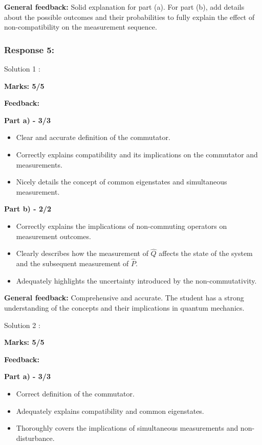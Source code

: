 \documentclass[a4paper,11pt]{article}
\begin{document}
\textbf{General feedback:}
Solid explanation for part (a). For part (b), add details about the possible outcomes and their probabilities to fully explain the effect of non-compatibility on the measurement sequence.


\subsubsection*{Response 5:}

Solution 1 :

\textbf{Marks: 5/5}

\textbf{Feedback:}

\textbf{Part a) - 3/3}

\begin{itemize}
    \item Clear and accurate definition of the commutator.
    \item Correctly explains compatibility and its implications on the commutator and measurements.
    \item Nicely details the concept of common eigenstates and simultaneous measurement.
\end{itemize}

\textbf{Part b) - 2/2}

\begin{itemize}
    \item Correctly explains the implications of non-commuting operators on measurement outcomes.
    \item Clearly describes how the measurement of $\hat{Q}$ affects the state of the system and the subsequent measurement of $\hat{P}$.
    \item Adequately highlights the uncertainty introduced by the non-commutativity.
\end{itemize}

\textbf{General feedback:}
Comprehensive and accurate. The student has a strong understanding of the concepts and their implications in quantum mechanics.



Solution 2 :

\textbf{Marks: 5/5}

\textbf{Feedback:}

\textbf{Part a) - 3/3}

\begin{itemize}
    \item Correct definition of the commutator.
    \item Adequately explains compatibility and common eigenstates.
    \item Thoroughly covers the implications of simultaneous measurements and non-disturbance.
\end{itemize}
\end{document}
